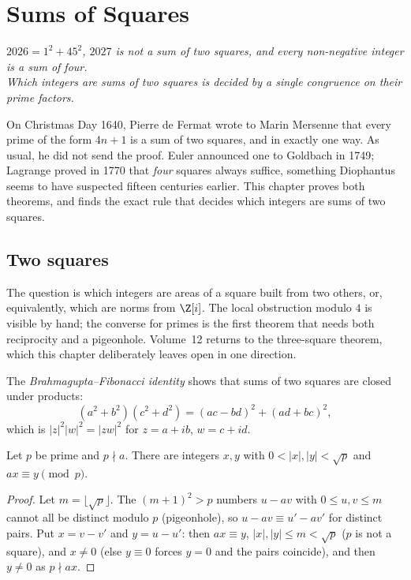 \chapter{Sums of Squares}\label{ch:squares}

\begin{center}\itshape
$2026=1^2+45^2$, $2027$ is not a sum of two squares, and every non-negative integer is a sum of four.\\
Which integers are sums of two squares is decided by a single congruence on their prime factors.
\end{center}

On Christmas Day 1640, Pierre de Fermat wrote to Marin Mersenne that every prime of the form $4n+1$ is a sum of two squares, and in exactly one way.
As usual, he did not send the proof. Euler announced one to Goldbach in 1749; Lagrange proved in 1770 that \emph{four} squares always suffice,
something Diophantus seems to have suspected fifteen centuries earlier. This chapter proves both theorems, and finds the exact rule that decides which
integers are sums of two squares.


\section{Two squares}

The question is which integers are areas of a square built from two others, or, equivalently, which are norms from $\Z[i]$. The local obstruction modulo $4$ is visible by hand; the converse for primes is the first theorem that needs both reciprocity and a pigeonhole. Volume~12 returns to the three-square theorem, which this chapter deliberately leaves open in one direction.

The \emph{Brahmagupta--Fibonacci identity} shows that sums of two squares are closed under products:
\[
(a^2+b^2)(c^2+d^2)=(ac-bd)^2+(ad+bc)^2,
\]
which is $|z|^2|w|^2=|zw|^2$ for $z=a+ib$, $w=c+id$.

\begin{lemma}[Thue]\label{lem:thue}
Let $p$ be prime and $p\nmid a$. There are integers $x,y$ with $0<|x|,|y|<\sqrt p$ and $ax\equiv y\pmod p$.
\end{lemma}
\begin{proof}
Let $m=\lfloor\sqrt p\rfloor$. The $(m+1)^2>p$ numbers $u-av$ with $0\le u,v\le m$ cannot all be distinct modulo $p$ (pigeonhole), so $u-av\equiv u'-av'$ for distinct pairs. Put $x=v-v'$ and $y=u-u'$: then $ax\equiv y$, $|x|,|y|\le m<\sqrt p$ ($p$ is not a square), and $x\ne0$ (else $y\equiv0$ forces $y=0$ and the pairs coincide), and then $y\ne0$ as $p\nmid ax$.
\end{proof}

